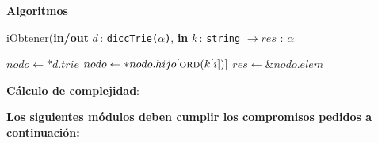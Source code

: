 \documentclass[10pt, a4paper]{article}
\let\TipoVariable=\texttt
\let\ModificadorArgumento=\textbf
\newcommand{\In}[2]{\ModificadorArgumento{in} \ensuremath{#1}\,: \TipoVariable{#2}\xspace}
\newcommand{\Inout}[2]{\ModificadorArgumento{in/out} \ensuremath{#1}\,: \TipoVariable{#2}\xspace}
\newenvironment{Servicios Usados}{%
  \vspace*{2ex}
  \noindent\textbf{\Large Servicios Usados}%
  \vspace*{2ex}
}{}
\newenvironment{Algoritmos}{%
  \vspace*{2ex}%
  \noindent\textbf{\Large Algoritmos}%
  \vspace*{2ex}%
}{}
\newenvironment{Algoritmos Del Iterador}{%
  \vspace*{2ex}%
  \noindent\textbf{\Large Algoritmos Del Iterador}%
  \vspace*{2ex}%
}{}
\newcommand{\DRef}{\ensuremath{\rightarrow}}
\begin{document}
\begin{Algoritmos}
\begin{algorithm}[H]
\caption*{iObtener(\Inout{d}{diccTrie($\alpha$)}, \In{k}{string} $\DRef res$ : \TipoVariable{$\alpha$}}
\begin{algorithmic}[1]
	\State $nodo \gets *d.trie$
    	\State $nodo \gets *nodo.hijo[\Call{ord}{k[i]}]$
	\EndFor
	\State $res \gets \&nodo.elem$
\end{algorithmic}
\textbf{C\'alculo de complejidad}:   
\end{algorithm}
 
\end{Algoritmos}

\begin{Servicios Usados}

\textbf{Los siguientes m\'odulos deben cumplir los compromisos pedidos a continuaci\'on:}

\end{Servicios Usados}
\end{document}
